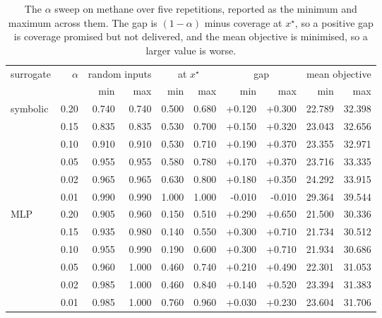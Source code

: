 \begin{table}[t]\centering
\small
\caption{The $\alpha$ sweep on methane over five repetitions, reported as the minimum and maximum across them. The gap is $(1-\alpha)$ minus coverage at $x^{\star}$, so a positive gap is coverage promised but not delivered, and the mean objective is minimised, so a larger value is worse.}
\label{tab:alpha-sweep}
\begin{tabular}{l r rr rr rr rr}
\toprule
surrogate & $\alpha$ & \multicolumn{2}{c}{random inputs} & \multicolumn{2}{c}{at $x^{\star}$} & \multicolumn{2}{c}{gap} & \multicolumn{2}{c}{mean objective} \\
\cmidrule(lr){3-4}\cmidrule(lr){5-6}\cmidrule(lr){7-8}\cmidrule(lr){9-10}
 & & min & max & min & max & min & max & min & max \\
\midrule
symbolic & 0.20 & 0.740 & 0.740 & 0.500 & 0.680 & +0.120 & +0.300 & 22.789 & 32.398 \\
 & 0.15 & 0.835 & 0.835 & 0.530 & 0.700 & +0.150 & +0.320 & 23.043 & 32.656 \\
 & 0.10 & 0.910 & 0.910 & 0.530 & 0.710 & +0.190 & +0.370 & 23.355 & 32.971 \\
 & 0.05 & 0.955 & 0.955 & 0.580 & 0.780 & +0.170 & +0.370 & 23.716 & 33.335 \\
 & 0.02 & 0.965 & 0.965 & 0.630 & 0.800 & +0.180 & +0.350 & 24.292 & 33.915 \\
 & 0.01 & 0.990 & 0.990 & 1.000 & 1.000 & -0.010 & -0.010 & 29.364 & 39.544 \\
\midrule
MLP & 0.20 & 0.905 & 0.960 & 0.150 & 0.510 & +0.290 & +0.650 & 21.500 & 30.336 \\
 & 0.15 & 0.935 & 0.980 & 0.140 & 0.550 & +0.300 & +0.710 & 21.734 & 30.512 \\
 & 0.10 & 0.955 & 0.990 & 0.190 & 0.600 & +0.300 & +0.710 & 21.934 & 30.686 \\
 & 0.05 & 0.960 & 1.000 & 0.460 & 0.740 & +0.210 & +0.490 & 22.301 & 31.053 \\
 & 0.02 & 0.985 & 1.000 & 0.460 & 0.840 & +0.140 & +0.520 & 23.394 & 31.383 \\
 & 0.01 & 0.985 & 1.000 & 0.760 & 0.960 & +0.030 & +0.230 & 23.604 & 31.706 \\
\bottomrule
\end{tabular}
\end{table}
